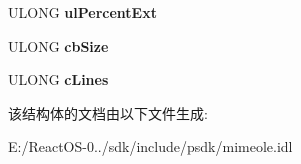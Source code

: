 \begin{DoxyCompactItemize}
U\+L\+O\+NG {\bfseries ul\+Percent\+Ext}
\item 
\mbox{\label{struct_m_i_m_e_o_l_e_1_1_i_mime_body_1_1tag_t_r_a_n_s_m_i_t_i_n_f_o_a160cc5cf11ae98a5f161cc520cb1edc2}} 
U\+L\+O\+NG {\bfseries cb\+Size}
\item 
\mbox{\label{struct_m_i_m_e_o_l_e_1_1_i_mime_body_1_1tag_t_r_a_n_s_m_i_t_i_n_f_o_ac26703dd9b26dda1c35e5279e1cd1756}} 
U\+L\+O\+NG {\bfseries c\+Lines}
\end{DoxyCompactItemize}


该结构体的文档由以下文件生成\+:\begin{DoxyCompactItemize}
\item 
E\+:/\+React\+O\+S-\/0../sdk/include/psdk/mimeole.\+idl\end{DoxyCompactItemize}
